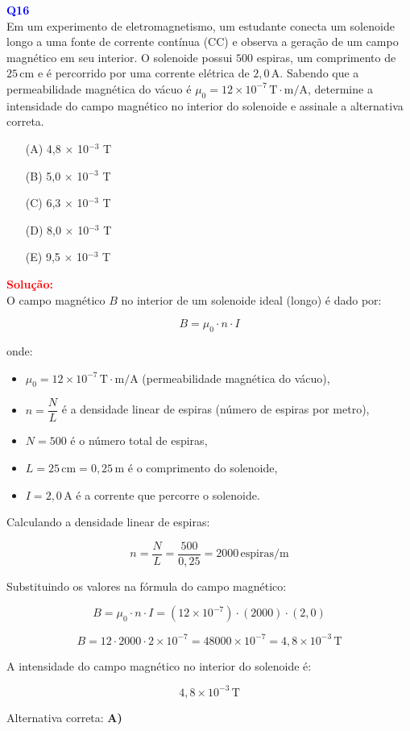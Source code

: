 \documentclass[a4paper,12pt]{article}
\begin{document}
\begin{flushleft}
\textbf{\textcolor{blue}{\Large Q16}}\\
Em um experimento de eletromagnetismo, um estudante conecta um solenoide longo 
a uma fonte de corrente contínua (CC) e observa a geração de um campo magnético 
em seu interior. O solenoide possui \( 500 \) espiras, um comprimento de \( 25\,\text{cm} \) 
e é percorrido por uma corrente elétrica de \( 2{,}0\,\text{A} \). Sabendo que a 
permeabilidade magnética do vácuo é \( \mu_0 = 12 \times 10^{-7}\,\text{T} \cdot \text{m/A} \), 
determine a intensidade do campo magnético no interior do solenoide e assinale a alternativa correta.

\begin{itemize}
\item[(A)] 4,8 $\times$ 10$^{-3}$ T
\item[(B)] 5,0 $\times$ 10$^{-3}$ T
\item[(C)] 6,3 $\times$ 10$^{-3}$ T
\item[(D)] 8,0 $\times$ 10$^{-3}$ T
\item[(E)] 9,5 $\times$ 10$^{-3}$ T
\end{itemize}

\vspace{0.5cm}

\textcolor{red}{\textbf{Solução:}}\\

O campo magnético \( B \) no interior de um solenoide ideal (longo) é dado por:

\[
B = \mu_0 \cdot n \cdot I
\]

onde:
\begin{itemize}
    \item \( \mu_0 = 12 \times 10^{-7}\,\text{T} \cdot \text{m/A} \) (permeabilidade magnética do vácuo),
    \item \( n = \dfrac{N}{L} \) é a densidade linear de espiras (número de espiras por metro),
    \item \( N = 500 \) é o número total de espiras,
    \item \( L = 25\,\text{cm} = 0{,}25\,\text{m} \) é o comprimento do solenoide,
    \item \( I = 2{,}0\,\text{A} \) é a corrente que percorre o solenoide.
\end{itemize}

Calculando \colorbox{green!20}{a densidade linear de espiras:}

\[
n = \frac{N}{L} = \frac{500}{0{,}25} = 2000\,\text{espiras/m}
\]

Substituindo os valores na fórmula do campo magnético:

\[
B = \mu_0 \cdot n \cdot I
= (12 \times 10^{-7}) \cdot (2000) \cdot (2{,}0)
\]

\[
B = 12 \cdot 2000 \cdot 2 \times 10^{-7}
= 48000 \times 10^{-7}
= 4{,}8 \times 10^{-3}\,\text{T}
\]

A intensidade do campo magnético no interior do solenoide é:

\[
\boxed{4{,}8 \times 10^{-3}\,\text{T}}
\]

Alternativa correta: \colorbox{green!50}{\textbf{A)}}

\end{flushleft}
\end{document}
